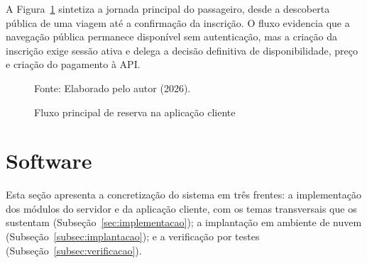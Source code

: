 \documentclass[12pt,openright,oneside,a4paper]{article}
\newcommand{\fonte}[1]{{\par\vspace{0.25em}\centering\footnotesize Fonte: #1.\par}}
\begin{document}
A Figura~\ref{fig:fe_fluxo_reserva} sintetiza a jornada principal do passageiro, desde a descoberta pública de uma viagem até a confirmação da inscrição. O fluxo evidencia que a navegação pública permanece disponível sem autenticação, mas a criação da inscrição exige sessão ativa e delega a decisão definitiva de disponibilidade, preço e criação do pagamento à API.

\begin{figure}[H]
\centering
\caption{Fluxo principal de reserva na aplicação cliente}
\label{fig:fe_fluxo_reserva}
\setlength{\fboxsep}{8pt}
\fonte{Elaborado pelo autor (2026)}
\end{figure}



\section{Software}

Esta seção apresenta a concretização do sistema em três frentes: a implementação dos módulos do servidor e da aplicação cliente, com os temas transversais que os sustentam (Subseção~\ref{sec:implementacao}); a implantação em ambiente de nuvem (Subseção~\ref{subsec:implantacao}); e a verificação por testes (Subseção~\ref{subsec:verificacao}).
\end{document}
